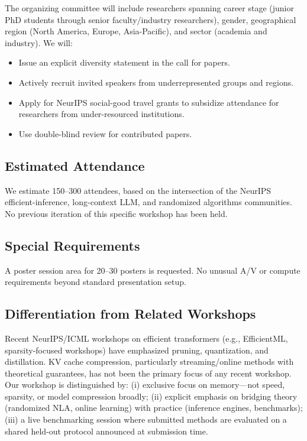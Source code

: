 \documentclass{article}
\begin{document}
The organizing committee will include researchers spanning career stage
(junior PhD students through senior faculty/industry researchers),
gender, geographical region (North America, Europe, Asia-Pacific), and
sector (academia and industry).  We will:
\begin{itemize}[nosep,leftmargin=1.5em]
  \item Issue an explicit diversity statement in the call for papers.
  \item Actively recruit invited speakers from underrepresented groups and regions.
  \item Apply for NeurIPS social-good travel grants to subsidize attendance for researchers from under-resourced institutions.
  \item Use double-blind review for contributed papers.
\end{itemize}

\subsection*{Estimated Attendance}

We estimate 150--300 attendees, based on the intersection of the NeurIPS
efficient-inference, long-context LLM, and randomized algorithms communities.
No previous iteration of this specific workshop has been held.

\subsection*{Special Requirements}

A poster session area for 20--30 posters is requested.
No unusual A/V or compute requirements beyond standard presentation setup.

\subsection*{Differentiation from Related Workshops}

Recent NeurIPS/ICML workshops on efficient transformers (e.g., EfficientML,
sparsity-focused workshops) have emphasized pruning, quantization, and
distillation.  KV cache compression, particularly streaming/online methods with
theoretical guarantees, has not been the primary focus of any recent workshop.
Our workshop is distinguished by: (i) exclusive focus on memory---not speed,
sparsity, or model compression broadly; (ii) explicit emphasis on bridging
theory (randomized NLA, online learning) with practice (inference engines,
benchmarks); (iii) a live benchmarking session where submitted methods are
evaluated on a shared held-out protocol announced at submission time.
\end{document}
